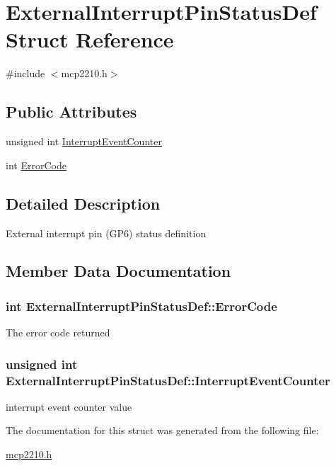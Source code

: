 \hypertarget{struct_external_interrupt_pin_status_def}{\section{\-External\-Interrupt\-Pin\-Status\-Def \-Struct \-Reference}
\label{struct_external_interrupt_pin_status_def}
}


{\ttfamily \#include $<$mcp2210.\-h$>$}

\subsection*{\-Public \-Attributes}
\begin{DoxyCompactItemize}
\item 
unsigned int \hyperlink{struct_external_interrupt_pin_status_def_a2aeec5fdeb39f15ad2a15cc7a229de9e}{\-Interrupt\-Event\-Counter}
\item 
int \hyperlink{struct_external_interrupt_pin_status_def_a94be603e5e321af81780d4a0583cea46}{\-Error\-Code}
\end{DoxyCompactItemize}


\subsection{\-Detailed \-Description}
\-External interrupt pin (\-G\-P6) status definition 

\subsection{\-Member \-Data \-Documentation}
\hypertarget{struct_external_interrupt_pin_status_def_a94be603e5e321af81780d4a0583cea46}{
\subsubsection[{\-Error\-Code}]{\setlength{\rightskip}{0pt plus 5cm}int {\bf \-External\-Interrupt\-Pin\-Status\-Def\-::\-Error\-Code}}}\label{struct_external_interrupt_pin_status_def_a94be603e5e321af81780d4a0583cea46}
\-The error code returned \hypertarget{struct_external_interrupt_pin_status_def_a2aeec5fdeb39f15ad2a15cc7a229de9e}{
\subsubsection[{\-Interrupt\-Event\-Counter}]{\setlength{\rightskip}{0pt plus 5cm}unsigned int {\bf \-External\-Interrupt\-Pin\-Status\-Def\-::\-Interrupt\-Event\-Counter}}}\label{struct_external_interrupt_pin_status_def_a2aeec5fdeb39f15ad2a15cc7a229de9e}
interrupt event counter value 

\-The documentation for this struct was generated from the following file\-:\begin{DoxyCompactItemize}
\item 
\hyperlink{mcp2210_8h}{mcp2210.\-h}\end{DoxyCompactItemize}
